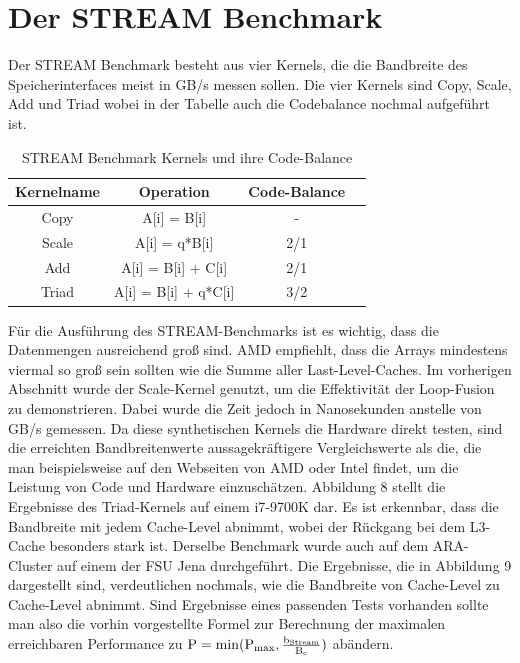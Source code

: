 \documentclass[sigconf,language=ngerman]{acmart}
\begin{document}
\section{Der STREAM Benchmark}
    Der STREAM Benchmark besteht aus vier Kernels, die die Bandbreite des Speicherinterfaces meist in GB/s messen sollen.
    Die vier Kernels sind Copy, Scale, Add und Triad wobei in der Tabelle auch die Codebalance nochmal aufgeführt ist.
    

    \begin{table}[h]
        \centering
        \begin{tabular}{|c|c|c|c|}
        \hline
        \textbf{Kernelname} & \textbf{Operation} & \textbf{Code-Balance} \\
        \hline
        Copy & A[i] = B[i] & - \\
        \hline
        Scale & A[i] = q*B[i] & 2/1 \\
        \hline
        Add & A[i] = B[i] + C[i] & 2/1 \\
        \hline
        Triad & A[i] = B[i] + q*C[i] & 3/2 \\
        \hline
        \end{tabular}
        \caption{STREAM Benchmark Kernels und ihre Code-Balance}
        \label{tab:stream_benchmark}
        \end{table}


    Für die Ausführung des STREAM-Benchmarks ist es wichtig, 
    dass die Datenmengen ausreichend groß sind. AMD empfiehlt, 
    dass die Arrays mindestens viermal so groß sein sollten wie die Summe aller Last-Level-Caches. %
    Im vorherigen Abschnitt wurde der Scale-Kernel genutzt, 
    um die Effektivität der Loop-Fusion zu demonstrieren. 
    Dabei wurde die Zeit jedoch in Nanosekunden anstelle von GB/s gemessen. 
    Da diese synthetischen Kernels die Hardware direkt testen, 
    sind die erreichten Bandbreitenwerte aussagekräftigere Vergleichswerte als die, 
    die man beispielsweise auf den Webseiten von AMD oder Intel findet, 
    um die Leistung von Code und Hardware einzuschätzen. %
    Abbildung 8 stellt die Ergebnisse des Triad-Kernels auf einem i7-9700K dar. %
    Es ist erkennbar, dass die Bandbreite mit jedem Cache-Level abnimmt, 
    wobei der Rückgang bei dem L3-Cache besonders stark ist. 
    Derselbe Benchmark wurde auch auf dem ARA-Cluster auf einem der FSU Jena durchgeführt. 
    Die Ergebnisse, die in Abbildung 9 dargestellt sind, verdeutlichen nochmals, 
    wie die Bandbreite von Cache-Level zu Cache-Level abnimmt. %
    Sind Ergebnisse eines passenden Tests vorhanden sollte man also die vorhin vorgestellte Formel zur Berechnung der maximalen erreichbaren
    Performance zu $\textnormal{P} =  \min(\textnormal{P}_{\textnormal{max}}, 
    \frac{\textnormal{b}_{\textnormal{Stream}}}{\textnormal{B}_{\textnormal{c}}})$ abändern.
\end{document}
